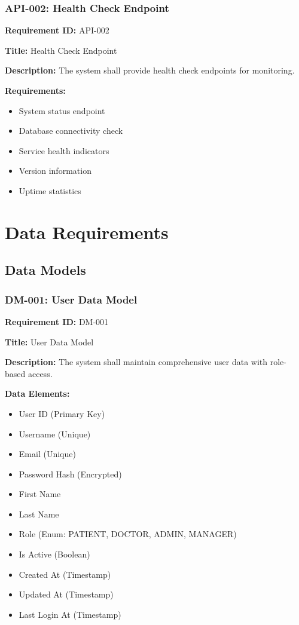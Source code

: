 \documentclass[12pt,a4paper]{article}
\begin{document}
\subsubsection{API-002: Health Check Endpoint}

\textbf{Requirement ID:} API-002

\textbf{Title:} Health Check Endpoint

\textbf{Description:} The system shall provide health check endpoints for monitoring.

\textbf{Requirements:}
\begin{itemize}
    \item System status endpoint
    \item Database connectivity check
    \item Service health indicators
    \item Version information
    \item Uptime statistics
\end{itemize}

\section{Data Requirements}

\subsection{Data Models}

\subsubsection{DM-001: User Data Model}

\textbf{Requirement ID:} DM-001

\textbf{Title:} User Data Model

\textbf{Description:} The system shall maintain comprehensive user data with role-based access.

\textbf{Data Elements:}
\begin{itemize}
    \item User ID (Primary Key)
    \item Username (Unique)
    \item Email (Unique)
    \item Password Hash (Encrypted)
    \item First Name
    \item Last Name
    \item Role (Enum: PATIENT, DOCTOR, ADMIN, MANAGER)
    \item Is Active (Boolean)
    \item Created At (Timestamp)
    \item Updated At (Timestamp)
    \item Last Login At (Timestamp)
\end{itemize}
\end{document}
